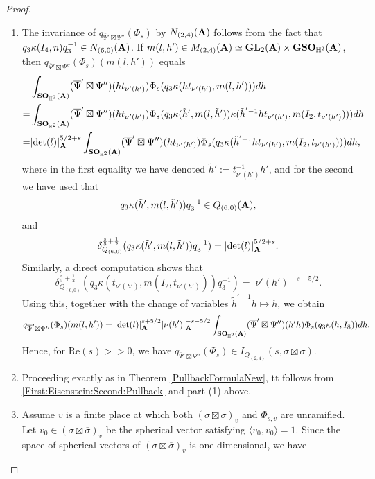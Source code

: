 \documentclass[11pt, reqno]{amsart}
\theoremstyle{plain}
\theoremstyle{definition}
\theoremstyle{remark}
\theoremstyle{plain}
\def\A{{\bf A}}
\def\det{\mathrm{det}}
\def\GSO{{\mathbf{GSO}}}
\def\GL{\mathbf{GL}}
\begin{document}
\begin{proof} \leavevmode
    \begin{enumerate}
        \item The invariance of $q_{\overline{\Psi}'\boxtimes\Psi''}(\Phi_{s})$ by $N_{(2,4)}(\A)$ follows from the fact that  $q_3\kappa(I_4,n)q_3^{-1}\in N_{(6,0)}(\A)$. 
        If $m(l,h')\in M_{(2,4)}(\A)\simeq \GL_2(\A)\times \GSO_{\mathbb{H}^2}(\A)$, then  $q_{\overline{\Psi}'\boxtimes\Psi''}(\Phi_{s})(m(l,h'))$ equals \begin{align} &\int_{\mathbf{SO}_{\mathbb{H}^2}(\A)}(\overline{\Psi}'\boxtimes\Psi'')(ht_{\nu'(h')})\Phi_{s}(q_3\kappa(ht_{\nu'(h')},m(l,h')))dh \nonumber \\
 =&\int_{\mathbf{SO}_{\mathbb{H}^2}(\A)}(\overline{\Psi}'\boxtimes\Psi'')(ht_{\nu'(h')})\Phi_{s}(q_3\kappa(\tilde{h}',m(l,\tilde{h}'))  \kappa(  {\tilde{h}}^{'-1}h t_{\nu'(h')}, m(I_2, t_{\nu'(h')})))dh \nonumber  \\ 
=&|\det(l)|^{5/2+s}_{\A}\int_{\mathbf{SO}_{\mathbb{H}^2}(\A)}(\overline{\Psi}'\boxtimes\Psi'')(ht_{\nu'(h')})\Phi_{s}(q_3  \kappa(  {\tilde{h}}^{'-1}h t_{\nu'(h')}, m(I_2, t_{\nu'(h')})))dh ,\nonumber 
        \end{align}
        where in the first equality we have denoted $\tilde{h}' := t_{\nu'(h')}^{-1}h'$, and for the second we have used that $$q_3\kappa(\tilde{h}',m(l,\tilde{h}'))q_3^{-1}\in Q_{(6,0)}(\A),$$ and $$\delta_{Q_{(6,0)}}^{\frac{s}{5}+\frac{1}{2}}(q_3\kappa(\tilde{h}',m(l,\tilde{h}'))q_3^{-1}) = |\det(l)|^{5/2+s}_{\A}.$$ 
        Similarly, a direct computation shows that $$\delta_{Q_{(6,0)}}^{\frac{s}{5}+\frac{1}{2}}(q_3 \kappa(  t_{\nu'(h')}, m(I_2, t_{\nu'(h')}))q_3^{-1}) = | \nu'(h')|^{-s-5/2}.$$
        Using this, together with the change of variables $\tilde{h}^{'-1}h\mapsto h$, we obtain  
\begin{align}\label{SecondAuxiliarIntegral:PullbackFormula2}
        q_{\overline{\Psi}'\boxtimes\Psi''}(\Phi_{s})(m(l,h')) = |\det(l)|^{s+5/2}_{\A}|\nu(h')|^{-s-5/2}_{\A}\int_{\mathbf{SO}_{\mathbb{H}^2}(\A)}(\overline{\Psi}'\boxtimes\Psi'')(h'h)\Phi_{s}(q_3\kappa(h,I_8))dh.
        \end{align}
        Hence, for $\mathrm{Re}(s)>>0$,  we have $q_{\overline{\Psi}'\boxtimes\Psi''}(\Phi_{s})\in I_{Q_{(2,4)}}(s,\overline{\sigma}\boxtimes \sigma)$. 
        \item Proceeding exactly as in Theorem \ref{PullbackFormulaNew}, tt follows from \eqref{First:Eisenstein:Second:Pullback} and part (1) above. 
        \item Assume $v$ is a finite place at which both $(\sigma\boxtimes\overline{\sigma})_v$ and $\Phi_{s,v}$ are unramified. Let $v_0\in (\sigma\boxtimes\overline{\sigma})_v$ be the spherical vector satisfying $\langle v_0,v_0\rangle = 1$. Since the space of spherical vectors of $(\sigma\boxtimes\overline{\sigma})_v$ is one-dimensional, we have

\end{enumerate}
\end{proof}
\end{document}
